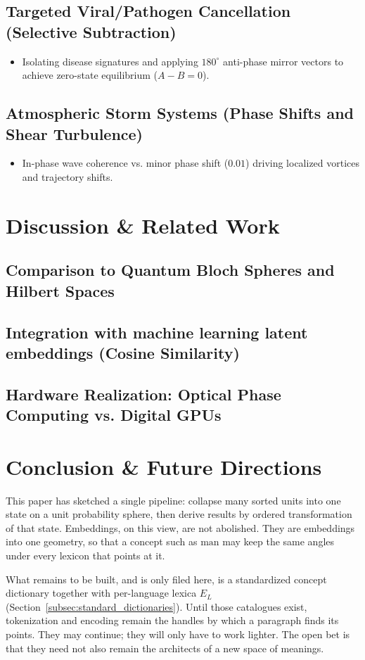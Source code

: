 \documentclass[12pt, a4paper]{article}
\begin{document}
\subsection{Targeted Viral/Pathogen Cancellation (Selective Subtraction)}
\begin{itemize}
    \item Isolating disease signatures and applying $180^\circ$ anti-phase mirror vectors to achieve zero-state equilibrium ($A - B = 0$).
\end{itemize}

\subsection{Atmospheric Storm Systems (Phase Shifts and Shear Turbulence)}
\begin{itemize}
    \item In-phase wave coherence vs. minor phase shift ($0.01$) driving localized vortices and trajectory shifts.
\end{itemize}

\section{Discussion \& Related Work}
\subsection{Comparison to Quantum Bloch Spheres and Hilbert Spaces}
\subsection{Integration with machine learning latent embeddings (Cosine Similarity)}
\subsection{Hardware Realization: Optical Phase Computing vs. Digital GPUs}

\section{Conclusion \& Future Directions}

This paper has sketched a single pipeline: collapse many sorted units
into one state on a unit probability sphere, then derive results by
ordered transformation of that state. Embeddings, on this view, are
not abolished. They are embeddings into one geometry, so that a
concept such as $\mathrm{man}$ may keep the same angles under every
lexicon that points at it.

What remains to be built, and is only filed here, is a standardized
concept dictionary together with per-language lexica $E_L$
(Section~\ref{subsec:standard_dictionaries}). Until those catalogues
exist, tokenization and encoding remain the handles by which a
paragraph finds its points. They may continue; they will only have to
work lighter. The open bet is that they need not also
remain the architects of a new space of meanings.
\end{document}
